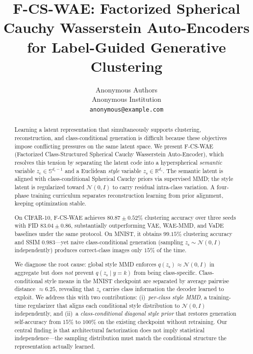 \documentclass[10pt]{article}
\title{\vspace{-1.0em}
F-CS-WAE: Factorized Spherical Cauchy Wasserstein Auto-Encoders\\
for Label-Guided Generative Clustering
\vspace{-0.3em}}
\author{
Anonymous Authors\\
\small Anonymous Institution\\
\small \texttt{anonymous@example.com}
}
\date{}
\newcommand{\ours}{F-CS-WAE}
\newcommand{\zc}{z_{\mathrm{c}}}
\newcommand{\zs}{z_{\mathrm{s}}}
\newcommand{\Sph}{\mathbb{S}}
\newcommand{\R}{\mathbb{R}}
\begin{document}
\maketitle

\begin{abstract}
Learning a latent representation that simultaneously supports clustering,
reconstruction, and class-conditional generation is difficult because these
objectives impose conflicting pressures on the same latent space.
We present \ours{} (Factorized Class-Structured Spherical Cauchy Wasserstein
Auto-Encoder), which resolves this tension by separating the latent code into
a hyperspherical \emph{semantic} variable $\zc\in\Sph^{d_c-1}$ and a Euclidean
\emph{style} variable $\zs\in\R^{d_s}$.
The semantic latent is aligned with class-conditional Spherical Cauchy priors
via supervised MMD; the style latent is regularized toward $\mathcal{N}(0,I)$
to carry residual intra-class variation.
A four-phase training curriculum separates reconstruction learning from prior
alignment, keeping optimization stable.

On CIFAR-10, \ours{} achieves $80.87\pm0.52\%$ clustering accuracy over three seeds
with FID $83.04\pm0.86$, substantially outperforming VAE, WAE-MMD, and VaDE baselines
under the same protocol.
On MNIST, it obtains $99.15\%$ clustering accuracy and SSIM $0.983$---yet naive
class-conditional generation (sampling $\zs\sim\mathcal{N}(0,I)$ independently)
produces correct-class images only $15\%$ of the time.

We diagnose the root cause: global style MMD enforces $q(\zs)\approx\mathcal{N}(0,I)$
in aggregate but does \emph{not} prevent $q(\zs\mid y{=}k)$ from being class-specific.
Class-conditional style means in the MNIST checkpoint are separated by average
pairwise distance ${\approx}6.25$, revealing that $\zs$ carries class information
the decoder learned to exploit.
We address this with two contributions: (i)~\emph{per-class style MMD}, a
training-time regularizer that aligns each conditional style distribution to
$\mathcal{N}(0,I)$ independently, and (ii)~a \emph{class-conditional diagonal style prior}
that restores generation self-accuracy from $15\%$ to $100\%$ on the existing
checkpoint without retraining.
Our central finding is that architectural factorization does not imply statistical
independence---the sampling distribution must match the conditional structure the
representation actually learned.
\end{abstract}
\end{document}
